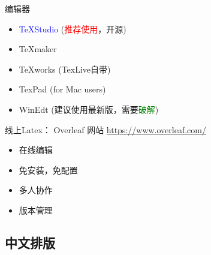 \documentclass[13pt]{ctexbeamer}
\newcommand{\red}[1]{\textcolor{red}{#1}}
\newcommand{\blue}[1]{\textcolor{blue}{#1}}
\newcommand{\green}[1]{\textcolor{green}{#1}}
\begin{document}
\begin{frame}{编辑器}
\begin{itemize}
\item  \blue{TeXStudio} (\red{推荐使用}，开源)
\item TeXmaker
\item TeXworks (TexLive自带)
\item TexPad (for Mac users)
\item WinEdt (建议使用最新版，需要\green{破解})
\end{itemize}
\end{frame}






\begin{frame}{线上Latex：  Overleaf}
网站 
\href{https://www.overleaf.com/
}{https://www.overleaf.com/
}
\begin{itemize}
\item 在线编辑

\item 免安装，免配置

\item 多人协作

\item 版本管理
\end{itemize}
\end{frame}


  
\subsection{中文排版}

%
%
%    
\end{document}
